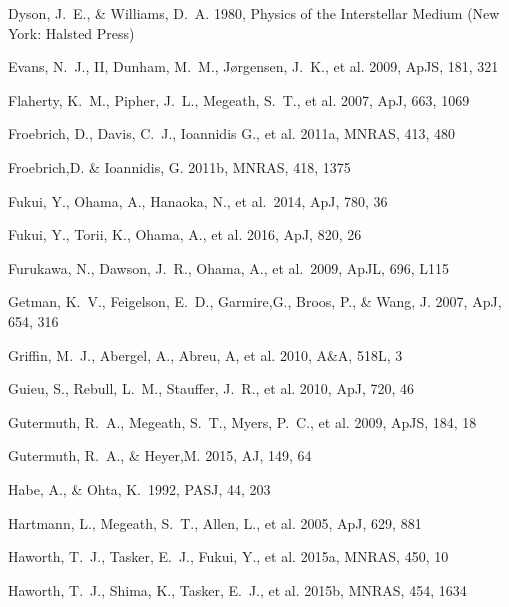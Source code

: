 \documentclass[iop]{emulateapj}
\begin{document}
\begin{thebibliography}{}
Dyson, J.~E., \& Williams, D.~A. 1980, Physics of the Interstellar Medium (New York: Halsted Press)

Evans, N.~J., II, Dunham, M.~M., J\o{}rgensen, J.~K., et al. 2009, ApJS, 181, 321

Flaherty, K.~M., Pipher, J.~L., Megeath, S.~T., et al. 2007, ApJ, 663, 1069

Froebrich, D., Davis, C.~J., Ioannidis G., et al. 2011a, MNRAS, 413, 480

Froebrich,D. \& Ioannidis, G. 2011b, MNRAS, 418, 1375

Fukui, Y., Ohama, A., Hanaoka, N., et al.\ 2014, ApJ, 780, 36 

Fukui, Y., Torii, K., Ohama, A., et al. 2016, ApJ, 820, 26 

Furukawa, N., Dawson, J.~R., Ohama, A., et al.\ 2009, ApJL, 696, L115 

Getman, K.~V., Feigelson, E.~D., Garmire,G., Broos, P., \& Wang, J. 2007, ApJ, 654, 316 

Griffin, M.~J., Abergel, A., Abreu, A, et al. 2010, A\&A, 518L, 3

Guieu, S., Rebull, L.~M., Stauffer, J.~R., et al. 2010, ApJ, 720, 46

Gutermuth, R.~A., Megeath, S.~T., Myers, P.~C., et al. 2009, ApJS, 184, 18

Gutermuth, R.~A., \& Heyer,M. 2015, AJ, 149, 64

Habe, A., \& Ohta, K.\ 1992, PASJ, 44, 203 

Hartmann, L., Megeath, S.~T., Allen, L., et al. 2005, ApJ, 629, 881

Haworth, T.~J., Tasker, E.~J., Fukui, Y., et al. 2015a, MNRAS, 450, 10

Haworth, T.~J., Shima, K., Tasker, E.~J., et al. 2015b, MNRAS, 454, 1634


\end{thebibliography}
\end{document}
